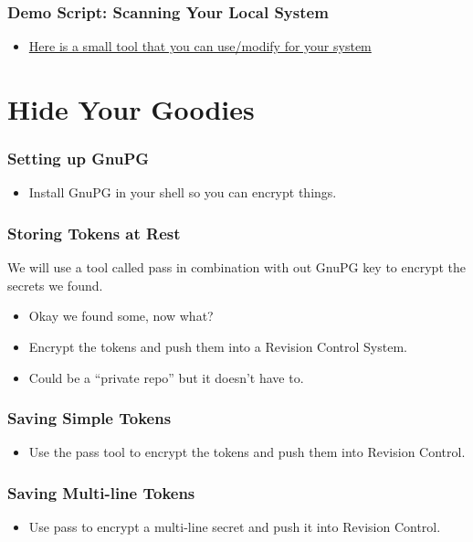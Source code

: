 \documentclass[aspectratio=169]{beamer}
\makeatletter
\def\sectionsubtitle#1{\gdef\@sectionsubtitle{#1}}
\gdef\@sectionsubtitle{}
\makeatother
\begin{document}
\begin{frame}
	\frametitle{Demo Script: Scanning Your Local System}
	\begin{itemize}
        \item\href{ https://github.com/devsecfranklin/stash-house/tree/main/demo/01_scanner}{Here is a small tool that you can use/modify for your system}
	\end{itemize}
\end{frame}

\sectionsubtitle{We found the secrets, now what?}
\section{Hide Your Goodies}

\begin{frame}
    \frametitle{Setting up GnuPG}
    \begin{itemize}
        \item Install GnuPG in your shell so you can encrypt things.
    \end{itemize}
\end{frame}

\begin{frame}
	\frametitle{Storing Tokens at Rest}
    We will use a tool called pass in combination with out GnuPG key to encrypt the secrets we found.
	\begin{itemize}
        \item Okay we found some, now what?
		\item Encrypt the tokens and push them into a Revision Control System.
        \item Could be a ``private repo'' but it doesn't have to.
	\end{itemize}
\end{frame}

\begin{frame}
	\frametitle{Saving Simple Tokens}
	\begin{itemize}
		\item Use the pass tool to encrypt the tokens and push them into Revision Control.
	\end{itemize}
\end{frame}

\begin{frame}
	\frametitle{Saving Multi-line Tokens}
	\begin{itemize}
		\item Use pass to encrypt a multi-line secret and push it into Revision Control.
	\end{itemize}
\end{frame}
\end{document}
